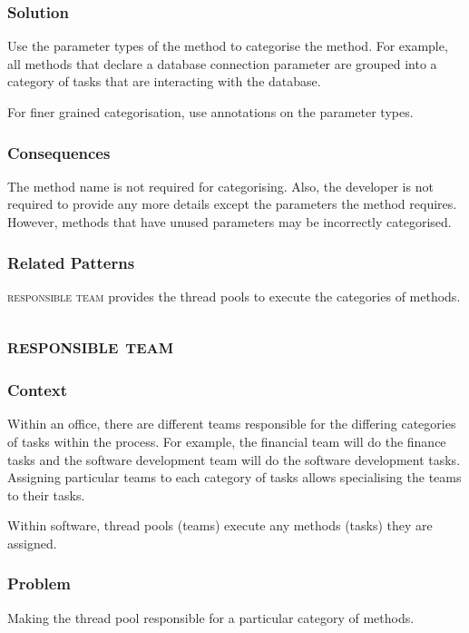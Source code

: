\documentclass[prodmode]{style/acmlarge}
\begin{document}
\subsubsection*{\textbf{Solution}} Use the parameter types of the method to categorise
the method.  For example, all methods that declare a database connection
parameter are grouped into a category of tasks that are interacting with the
database.

For finer grained categorisation, use annotations on the parameter types.

\subsubsection*{Consequences} The method name is not required for categorising.
Also, the developer is not required to provide any more details except the
parameters the method requires.  However, methods that have unused parameters
may be incorrectly categorised.

\subsubsection*{Related Patterns} \textsc{responsible team} provides the thread
pools to execute the categories of methods.



\subsection{\textsc{\textbf{responsible team}}}

\subsubsection*{Context} Within an office, there are different teams responsible
for the differing categories of tasks within the process.  For example, the
financial team will do the finance tasks and the software development team will
do the software development tasks.  Assigning particular teams to each category
of tasks allows specialising the teams to their tasks.

Within software, thread pools (teams) execute any methods (tasks) they are
assigned.

\subsubsection*{\textbf{Problem}} Making the thread pool responsible for a particular
category of methods.
\end{document}
